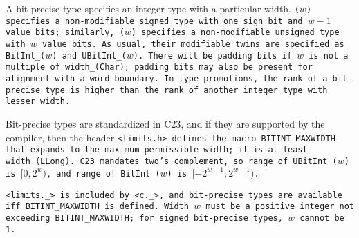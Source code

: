 A bit-precise type specifies an integer type with a particular width.
 \tt{(}$w$\tt{)} specifies a non-modifiable signed type with one
sign bit and $w - 1$ value bits; similarly,  \tt{(}$w$\tt{)}
specifies a non-modifiable unsigned type with $w$ value bits.
As usual, their modifiable twins are specified as
\tt{BitInt_(}$w$\tt{)} and \tt{UBitInt_(}$w$\tt{)}.
There will be padding bits if $w$ is not a multiple of \tt{width_(Char)};
padding bits may also be present for alignment with a word boundary.
In type promotions, the rank of a bit-precise type is higher
than the rank of another integer type with lesser width.

Bit-precise types are standardized in C23, and if they are supported by the
compiler, then the header \tt{<limits.h>} defines the macro \tt{BITINT_MAXWIDTH}
that expands to the maximum permissible width; it is at least \tt{width_(LLong)}.
C23 mandates two's complement, so range of \tt{UBitInt (}$w$\tt{)} is
$[0, 2^w)$, and range of \tt{BitInt (}$w$\tt{)} is $[-2^{w-1}, 2^{w-1})$.

\note \tt{<limits._>} is included by \tt{<c._>},
and bit-precise types are available iff \tt{BITINT_MAXWIDTH} is defined.
Width $w$ must be a positive integer not exceeding \tt{BITINT_MAXWIDTH};
for signed bit-precise types, $w$ cannot be 1.
